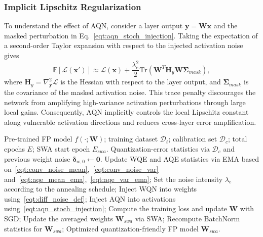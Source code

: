 \documentclass{article}
\begin{document}
\subsubsection{Implicit Lipschitz Regularization}
\label{sec:aqn_theory}

To understand the effect of AQN, consider a layer output $\boldsymbol{y}=\boldsymbol{W}\boldsymbol{x}$ and the masked perturbation in Eq.~\eqref{eqt:aqn_stoch_injection}. Taking the expectation of a second-order Taylor expansion with respect to the injected activation noise gives
\begin{equation}
\label{eqt:aqn_taylor}
\mathbb{E}[\mathcal{L}(\boldsymbol{x}')] \approx \mathcal{L}(\boldsymbol{x}) + \frac{\lambda_e^2}{2} \mathrm{Tr}\left( \boldsymbol{W}^T \boldsymbol{H}_y \boldsymbol{W} \boldsymbol{\Sigma}_{mask} \right),
\end{equation}
where $\boldsymbol{H}_y = \nabla^2_{\boldsymbol{y}}\mathcal{L}$ is the Hessian with respect to the layer output, and $\boldsymbol{\Sigma}_{mask}$ is the covariance of the masked activation noise. This trace penalty discourages the network from amplifying high-variance activation perturbations through large local gains. Consequently, AQN implicitly controls the local Lipschitz constant along vulnerable activation directions and reduces cross-layer error amplification.

\begin{algorithm}[t!]
   \caption{The ETBQ Framework}
   \label{alg:etbq}
\begin{algorithmic}[1]
      Pre-trained FP model $f(\cdot; \boldsymbol{W})$;
      training dataset $\mathscr{D}_{t}$;
      calibration set $\mathscr{D}_{c}$;
      total epochs $E$; SWA start epoch $E_{swa}$.
    Quantization-error statistics via $\mathscr{D}_{c}$ and previous weight noise $\boldsymbol{\delta}_{w, 0} \leftarrow \mathbf{0}$.
        \STATE Update WQE and AQE statistics via EMA based on~\eqref{eqt:conv_noise_mean},~\eqref{eqt:conv_noise_var} and~\eqref{eqt:aqe_mean_ema},~\eqref{eqt:aqe_var_ema};
        \STATE Set the noise intensity $\lambda_e$ according to the annealing schedule;
            \STATE Inject WQN into weights using~\eqref{eqt:diff_noise_def};
            \STATE Inject AQN into activations using~\eqref{eqt:aqn_stoch_injection};
            \STATE Compute the training loss and update $\boldsymbol{W}$ with SGD;
        \ENDFOR
            \STATE Update the averaged weights $\boldsymbol{W}_{swa}$ via SWA;
        \ENDIF
    \ENDFOR
    \STATE Recompute BatchNorm statistics for $\boldsymbol{W}_{swa}$;
     Optimized quantization-friendly FP model $\boldsymbol{W}_{swa}$.
\end{algorithmic}
\end{algorithm}
\end{document}

